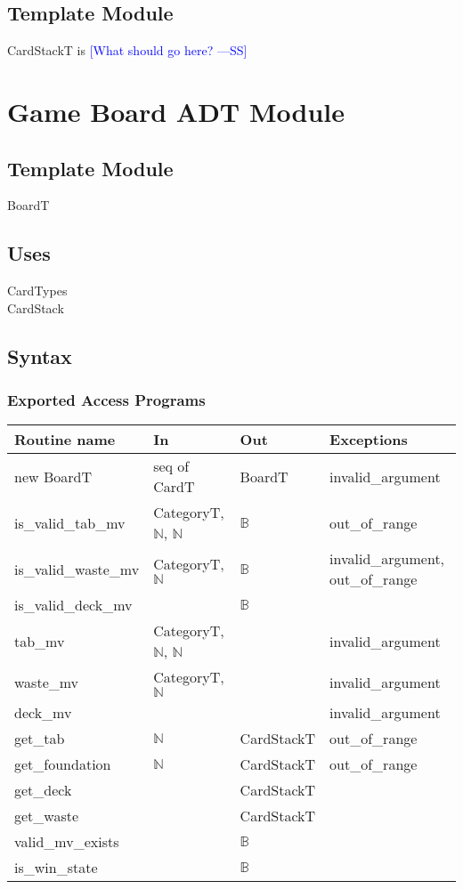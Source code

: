 \documentclass[12pt]{article}
\newcommand{\authornote}[3]{\textcolor{#1}{[#3 ---#2]}}
\newcommand{\authornote}[3]{}
\newcommand{\wss}[1]{\authornote{blue}{SS}{#1}}
\begin{document}
\subsection* {Template Module}

CardStackT is \wss{What should go here?}

\newpage

\section* {Game Board ADT Module}

\subsection*{Template Module}

BoardT

\subsection* {Uses}

\noindent CardTypes\\
\noindent CardStack

\subsection* {Syntax}

\subsubsection* {Exported Access Programs}

\begin{tabular}{| l | l | l | l |}
\hline
\textbf{Routine name} & \textbf{In} & \textbf{Out} & \textbf{Exceptions}\\
\hline
new BoardT  & seq of CardT & BoardT & invalid\_argument\\
\hline
is\_valid\_tab\_mv & CategoryT, $\mathbb{N}$, $\mathbb{N}$ & $\mathbb{B}$ & out\_of\_range\\
\hline
is\_valid\_waste\_mv & CategoryT, $\mathbb{N}$ & $\mathbb{B}$ &
                                                                invalid\_argument, out\_of\_range\\
\hline
is\_valid\_deck\_mv &  &  $\mathbb{B}$ & \\
\hline
tab\_mv & CategoryT, $\mathbb{N}$, $\mathbb{N}$ & & invalid\_argument\\
\hline
waste\_mv & CategoryT, $\mathbb{N}$ & & invalid\_argument\\
\hline
deck\_mv &  & & invalid\_argument\\
\hline
get\_tab & $\mathbb{N}$ & CardStackT & out\_of\_range\\
\hline
get\_foundation & $\mathbb{N}$ & CardStackT & out\_of\_range\\
\hline
get\_deck &  & CardStackT & \\
\hline
get\_waste &  & CardStackT & \\
\hline
valid\_mv\_exists & & $\mathbb{B}$ &\\
\hline
is\_win\_state & & $\mathbb{B}$ & \\
\hline
\end{tabular}
\end{document}

